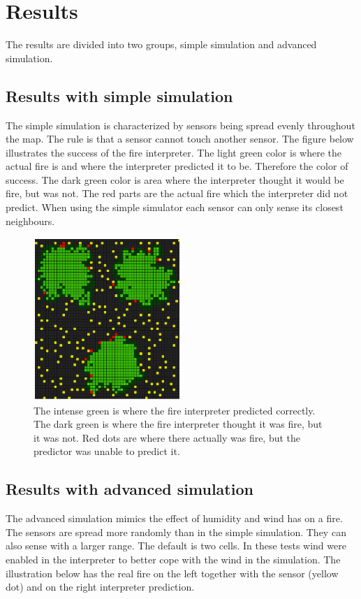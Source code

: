 \section{Results}
The results are divided into two groups, simple simulation and advanced simulation.
\subsection{Results with simple simulation}
The simple simulation is characterized by sensors being spread evenly throughout the map. The rule is that a sensor cannot touch another sensor. The figure below illustrates the success of the fire interpreter. The light green color is where the actual fire is and where the interpreter predicted it to be. Therefore the color of success. The dark green color is area where the interpreter thought it would be fire, but was not. The red parts are the actual fire which the interpreter did not predict. When using the simple simulator each sensor can only sense its closest neighbours. 
\begin{figure}[here]
  \centering
      \includegraphics[width=0.5\textwidth]{discussion/graphics/results-simple-compare.png}
  \caption{The intense green is where the fire interpreter predicted correctly. The dark green is where the fire interpreter thought it was fire, but it was not. Red dots are where there actually was fire, but the predictor was unable to predict it.}
  \label{fig:simple-results1}
\end{figure}


\subsection{Results with advanced simulation}
The advanced simulation mimics the effect of humidity and wind has on a fire. The sensors are spread more randomly than in the simple simulation. They can also sense with a larger range. The default is two cells. In these tests wind were enabled in the interpreter to better cope with the wind in the simulation. The illustration below has the real fire on the left together with the sensor (yellow dot) and on the right interpreter prediction.

